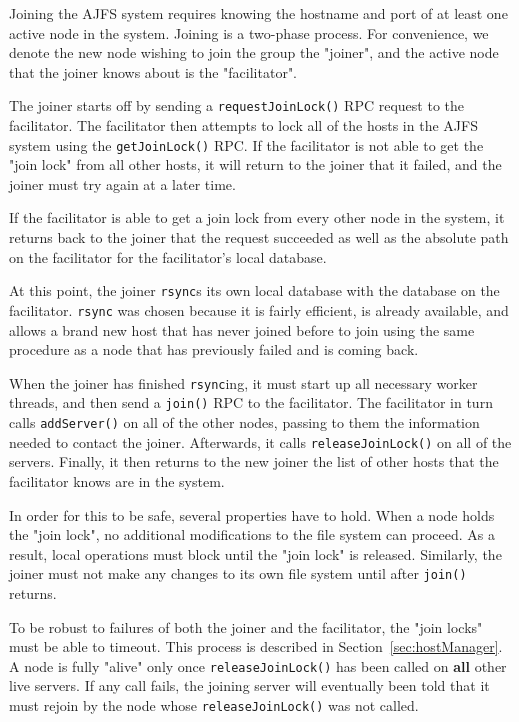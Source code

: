 
Joining the AJFS system requires knowing the hostname and port of at least one
active node in the system. Joining is a two-phase process. For convenience, we
denote the new node wishing to join the group the "joiner", and the active node
that the joiner knows about is the "facilitator".

The joiner starts off by sending a \texttt{requestJoinLock()} RPC request to the
facilitator. The facilitator then attempts to lock all of the hosts in the AJFS
system using the \texttt{getJoinLock()} RPC. If the facilitator is not able to
get the "join lock" from all other hosts, it will return to the joiner that it
failed, and the joiner must try again at a later time.

If the facilitator is able to get a join lock from every other node in the
system, it returns back to the joiner that the request succeeded as well as the
absolute path on the facilitator for the facilitator's local database.

At this point, the joiner \texttt{rsync}s its own local database with the
database on the facilitator. \texttt{rsync} was chosen because it is fairly
efficient, is already available, and allows a brand new host that has never
joined before to join using the same procedure as a node that has previously
failed and is coming back.

When the joiner has finished \texttt{rsync}ing, it must start up all necessary
worker threads, and then send a \texttt{join()} RPC to the facilitator. The
facilitator in turn calls \texttt{addServer()} on all of the other nodes,
passing to them the information needed to contact the joiner. Afterwards, it
calls \texttt{releaseJoinLock()} on all of the servers. Finally, it then returns
to the new joiner the list of other hosts that the facilitator knows are in the
system.

In order for this to be safe, several properties have to hold. When a node 
holds the "join lock", no additional modifications to the file system can
proceed. As a result, local operations must block until the "join lock" is
released. Similarly, the joiner must not make any changes to its own file system
until after \texttt{join()} returns.

To be robust to failures of both the joiner and the facilitator, the "join
locks" must be able to timeout. This process is described in
Section~\ref{sec:hostManager}. A node is fully "alive" only once
\texttt{releaseJoinLock()} has been called on \textbf{all} other live servers.
If any call fails, the joining server will eventually been told that it must
rejoin by the node whose \texttt{releaseJoinLock()} was not called.

